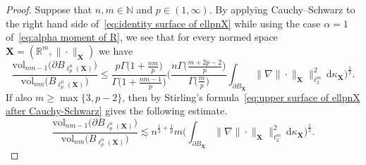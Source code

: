 \documentclass[11pt,reqno]{amsart}
\renewcommand{\le}{\leqslant}
\renewcommand{\ge}{\geqslant}
\newcommand{\ud}[0]{\,\mathrm{d}}
\newcommand{\X}{\mathbf X}
\newcommand{\R}{\mathbb R}
\theoremstyle{remark}
\newcommand{\N}{\mathbb N}
\newcommand{\vol}{\mathrm{vol}}
\renewcommand{\1}{\mathbf 1}
\begin{document}
\begin{proof} Suppose that $n,m\in \N$ and $p\in (1,\infty)$. By applying Cauchy--Schwarz to the right hand side of~\eqref{eq:identity surface of ellpnX} while using the case $\alpha=1$ of~\eqref{eq:alpha moment of R}, we see that for every normed space $\X=(\R^m,\|\cdot\|_\X)$ we have
\begin{equation}\label{eq:upper surface of ellpnX after Cauchy-Schwarz}
\frac{\vol_{nm-1}\big(\partial B_{\ell_p^n(\X)}\big)}{\vol_{nm}\big(B_{\ell_p^n(\X)}\big)}\le \frac{p\Gamma\big(1+\frac{nm}{p}\big)}{\Gamma\big(1+\frac{nm-1}{p}\big)}\Bigg(\frac{n\Gamma\big(\frac{m+2p-2}{p}\big)}{\Gamma\big(\frac{m}{p}\big)}\int_{\partial B_{\X}} \big\|\nabla\|\cdot\|_{\X}\big\|_{\ell_2^m}^2\ud\kappa_{\X}\Bigg)^{\frac12}.
\end{equation}
If also $m\ge \max\{3,p-2\}$, then by Stirling's formula~\eqref{eq:upper surface of ellpnX after Cauchy-Schwarz} gives the following estimate.
\begin{equation}\label{eq:upper surface of ellpnX after Cauchy-Schwarz2}
\frac{\vol_{nm-1}\big(\partial B_{\ell_p^n(\X)}\big)}{\vol_{nm}\big(B_{\ell_p^n(\X)}\big)}\lesssim n^{\frac12+\frac{1}{p}}m \bigg(\int_{\partial B_{\X}} \big\|\nabla\|\cdot\|_{\X}\big\|_{\ell_2^m}^2\ud\kappa_{\X}\bigg)^{\frac12}.
\end{equation}


\end{proof}
\end{document}
